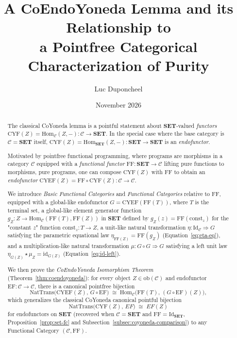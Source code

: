 \documentclass[11pt,a4paper]{article}
\title{\textbf{
  A CoEndoYoneda Lemma and its Relationship to\\
  a Pointfree Categorical Characterization of Purity
}}
\author{Luc Duponcheel}
\date{November 2026}
\theoremstyle{definition}
\theoremstyle{remark}
\newcommand{\Set}{\mathbf{SET}}
\newcommand{\Hom}{\mathrm{Hom}}
\newcommand{\NatTrans}{\mathrm{NatTrans}}
\newcommand{\Id}{\mathrm{Id}}
\newcommand{\id}{\mathrm{id}}
\newcommand{\CYF}{\mathrm{CYF}}
\newcommand{\CYEF}{\mathrm{CYEF}}
\newcommand{\FF}{\mathrm{FF}}
\newcommand{\EF}{\mathrm{EF}}
\newcommand{\const}{\mathrm{const}}
\begin{document}
\maketitle

\begin{abstract}
\noindent The classical CoYoneda lemma is a pointful statement about $\Set$-valued \emph{functors}
$\CYF(Z) = \Hom_{\mathcal{C}}(Z, -) : \mathcal{C} \to \Set$. In the special case where the base
category is $\mathcal{C} = \Set$ itself, $\CYF(Z) = \Hom_{\Set}(Z, -) : \Set \to \Set$ is an
\emph{endofunctor}.

\vspace{4pt}

\noindent Motivated by pointfree functional programming, where programs are morphisms in a category
$\mathcal{C}$ equipped with a \emph{functional functor} $\FF : \Set \to \mathcal{C}$ lifting pure
functions to morphisms, pure programs, one can compose $\CYF(Z)$ with $\FF$  to obtain an
\emph{endofunctor} $\CYEF(Z) = \FF \circ \CYF(Z) : \mathcal{C} \to \mathcal{C}$. 

\vspace{4pt}

\noindent We introduce \emph{Basic Functional Categories} and \emph{Functional Categories} relative
to $\FF$, equipped with a global-like endofunctor $G = \CYEF(\FF(T))$, where $T$ is the terminal
set, a global-like element generator function $g_Z : Z \to \Hom_{\mathcal{C}}(\FF(T), \FF(Z))$ in
$\Set$ defined by $g_Z(z) = \FF(\const_z)$ for the "constant $z$" function $\const_z : T \to Z$, a
unit-like natural transformation $\eta : \Id_{\mathcal{C}} \Rightarrow G$ satisfying the parametric
equational law $\eta_{\FF(Z)} = \FF(g_Z)$ (Equation~\eqref{eq:eta-eq}), and a multiplication-like
natural transformation $\mu : G \circ G \Rightarrow G$ satisfying a left unit law
$\eta_{G(Z)} \star \mu_Z = \id_{G(Z)}$ (Equation~\eqref{eq:id-left}). 

\vspace{4pt}

\noindent We then prove the \emph{CoEndoYoneda Isomorphism Theorem}
(Theorem~\ref{thm:coendoyoneda}): for every object $Z \in \mathrm{ob}(\mathcal{C})$ and endofunctor
$\EF : \mathcal{C} \to \mathcal{C}$, there is a canonical pointfree bijection
\[
  \NatTrans\bigl(\CYEF(Z),\, G \circ \EF\bigr)
  \;\cong\;
  \Hom_{\mathcal{C}}\bigl(\FF(T),\, (G \circ \EF)(Z)\bigr),
\]
which generalizes the classical CoYoneda canonical pointful bijection
\[
  \NatTrans\bigl(\CYF(Z),\, EF\bigr) 
  \;\cong\; 
  EF(Z)
\]
for endofunctors on $\Set$ (recovered when
$\mathcal{C} = \Set$ and $\FF = \Id_{\Set}$, Proposition~\ref{prop:set-fc} and
Subsection~\ref{subsec:coyoneda-comparison}) to any Functional Category $(\mathcal{C}, \FF)$.


\end{abstract}
\end{document}
